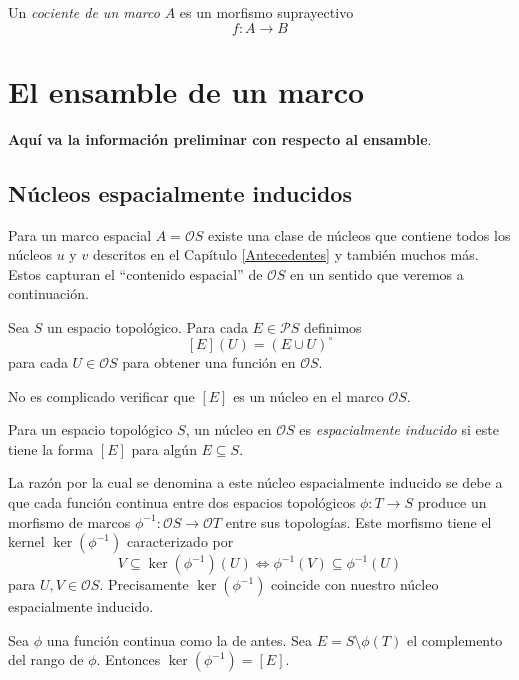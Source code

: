 \begin{dfn}\label{Cociente}
Un \emph{cociente de un marco} $A$ es un morfismo suprayectivo $$f:A\to B$$
\end{dfn}

\section{El ensamble de un marco}

\textbf{Aquí va la información preliminar con respecto al ensamble}.

\subsection{Núcleos espacialmente inducidos}

Para un marco espacial $A=\mathcal{O}S$ existe una clase de núcleos que contiene todos los núcleos $u$ y $v$ descritos en el Capítulo \ref{Antecedentes} y también muchos más. Estos capturan el ``contenido espacial'' de $\mathcal{O}S$ en un sentido que veremos a continuación.

\begin{dfn}\label{Definicion5.3.1}
    Sea $S$ un espacio topológico. Para cada $E\in \mathcal{P}S$ definimos 
    \[
    [E](U)=(E\cup U)^\circ
    \]
    para cada $U\in \mathcal{O}S$ para obtener una función en $\mathcal{O}S$.
\end{dfn}

No es complicado verificar que $[E]$ es un núcleo en el marco $\mathcal{O}S$.

\begin{dfn}\label{Definicon5.3.2}
    Para un espacio topológico $S$, un núcleo en $\mathcal{O}S$ es \emph{espacialmente inducido} si este tiene la forma $[E]$ para algún $E\subseteq S$.
\end{dfn}

La razón por la cual se denomina a este núcleo espacialmente inducido se debe a que cada función continua entre dos espacios topológicos $\phi\colon T\to S$ produce un morfismo de marcos $\phi^{-1}\colon \mathcal{O}S \to \mathcal{O}T$ entre sus topologías. Este morfismo tiene el kernel $\ker(\phi^{-1})$ caracterizado por 
\[
V\subseteq \ker(\phi^{-1})(U)\Leftrightarrow \phi^{-1}(V)\subseteq \phi^{-1}(U)
\]
para $U, V\in \mathcal{O}S$. Precisamente $\ker(\phi^{-1})$ coincide con nuestro núcleo espacialmente inducido.

\begin{thm}
    Sea $\phi$ una función continua como la de antes. Sea $E=S\setminus \phi(T)$ el complemento del rango de $\phi$. Entonces $\ker(\phi^{-1})=[E]$.
\end{thm}

